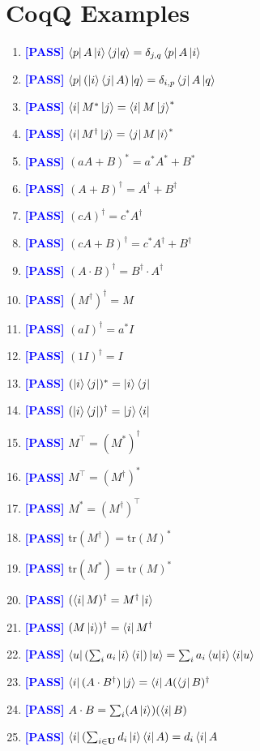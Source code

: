 \documentclass[manuscript, review, timestamp]{acmart}
\newcommand{\tr}{\mathrm{tr}}
\newcommand{\pass}{\textcolor{blue}{\textbf{ [PASS] }}}
\begin{document}
\section{CoqQ Examples}
\begin{enumerate}
  \item \pass $\bra{p}A\ket{i}\braket{j|q} = \delta_{j,q}\bra{p}A\ket{i}$
  \item \pass $\bra{p}(\ket{i}\bra{j}A)\ket{q} = \delta_{i, p}\bra{j}A\ket{q}$
  \item \pass $\bra{i}M^*\ket{j} = \bra{i}M\ket{j}^*$
  \item \pass $\bra{i}M^\dagger\ket{j} = \bra{j}M\ket{i}^*$
  \item \pass $(a A + B)^* = a^* A^* + B^*$
  \item \pass $(A+B)^\dagger = A^\dagger + B^\dagger$
  \item \pass $(c A)^\dagger = c^* A^\dagger$
  \item \pass $(c A + B)^\dagger = c^* A^\dagger + B^\dagger$
  \item \pass $(A \cdot B)^\dagger = B^\dagger \cdot A^\dagger$
  \item \pass $(M^\dagger)^\dagger = M$
  \item \pass $(aI)^\dagger = a^* I$
  \item \pass $(1 I)^\dagger = I$
  \item \pass $(\ket{i}\bra{j})^* = \ket{i}\bra{j}$
  \item \pass $(\ket{i}\bra{j})^\dagger = \ket{j}\bra{i}$
  \item \pass $M^\top = (M^*)^\dagger$
  \item \pass $M^\top = (M^\dagger)^*$
  \item \pass $M^* = (M^\dagger)^\top$
  \item \pass $\tr(M^\dagger) = \tr(M)^*$
  \item \pass $\tr(M^*) = \tr(M)^*$
  \item \pass $(\bra{i}M)^\dagger = M^\dagger \ket{i}$
  \item \pass $(M \ket{i})^\dagger = \bra{i} M^\dagger$
  \item \pass $\bra{u} \left( \sum_{i} a_i \ket{i}\bra{i} \right) \ket{u} = \sum_i a_i \braket{u|i}\braket{i|u}$
  \item \pass $\bra{i}(A\cdot B^\dagger)\ket{j} = \bra{i} A (\bra{j}B)^\dagger$
  \item \pass $A \cdot B = \sum_i (A \ket{i})(\bra{i} B)$
  \item \pass $\bra{i}(\sum_{i \in \mathbf{U}} d_i \ket{i}\bra{i} A) = d_i \bra{i} A$

\end{enumerate}
\end{document}
